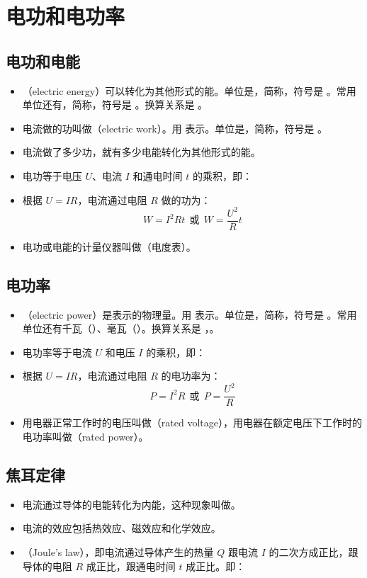 \section{电功和电功率}

\subsection{电功和电能}
\begin{itemize}
\item {}（electric energy）可以转化为其他形式的能。单位是，简称，符号是 。常用单位还有，简称，符号是 。换算关系是 。
\item 电流做的功叫做（electric work）。用  表示。单位是，简称，符号是 。
\item 电流做了多少功，就有多少电能转化为其他形式的能。
\item 电功等于电压 $U$、电流 $I$ 和通电时间 $t$ 的乘积，即：
\item 根据 $U=IR$，电流通过电阻 $R$ 做的功为：
$$
W=I^2Rt~~或~~W=\frac{U^2}Rt
$$
\item 电功或电能的计量仪器叫做（电度表）。
\end{itemize}

\subsection{电功率}
\begin{itemize}
\item {}（electric power）是表示的物理量。用  表示。单位是，简称，符号是 。常用单位还有千瓦（）、毫瓦（）。换算关系是 ，。
\item 电功率等于电流 $U$ 和电压 $I$ 的乘积，即：
\item 根据 $U=IR$，电流通过电阻 $R$ 的电功率为：
$$
P=I^2R~~或~~P=\frac{U^2}R
$$
\item 用电器正常工作时的电压叫做（rated voltage），用电器在额定电压下工作时的电功率叫做（rated power）。
\end{itemize}

\subsection{焦耳定律}
\begin{itemize}
\item 电流通过导体的电能转化为内能，这种现象叫做。
\item 电流的效应包括热效应、磁效应和化学效应。
\item {}（Joule's law），即电流通过导体产生的热量 $Q$ 跟电流 $I$ 的二次方成正比，跟导体的电阻 $R$ 成正比，跟通电时间 $t$ 成正比。即：
\end{itemize}